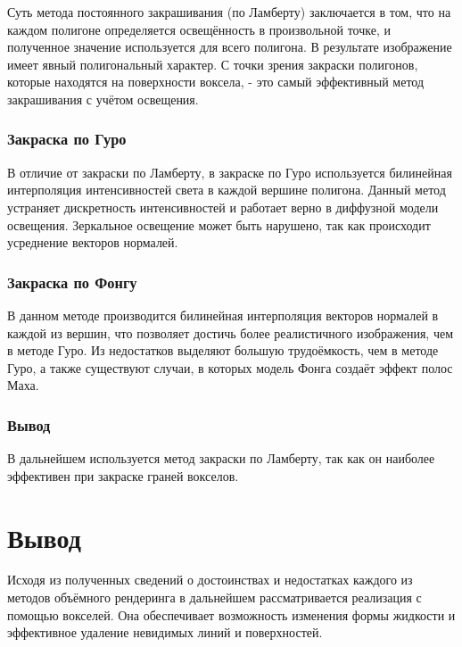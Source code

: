 Суть метода постоянного закрашивания (по Ламберту) заключается в том, что
на каждом полигоне определяется освещённость в произвольной точке, и полученное значение
используется для всего полигона\cite{site:fill}. В результате изображение имеет явный полигональный характер.
С точки зрения закраски полигонов, которые находятся на поверхности воксела, - это самый эффективный метод закрашивания с учётом освещения\cite{site:fill}.

\subsubsection{Закраска по Гуро}

В отличие от закраски по Ламберту, в закраске по Гуро используется билинейная интерполяция
интенсивностей света в каждой вершине полигона. Данный метод устраняет дискретность интенсивностей и работает верно в диффузной модели освещения. Зеркальное освещение может быть нарушено, так как происходит усреднение
векторов нормалей\cite{site:fill}.

\subsubsection{Закраска по Фонгу}

В данном методе производится билинейная интерполяция векторов нормалей в каждой из вершин, что
позволяет достичь более реалистичного изображения, чем в методе Гуро. Из недостатков выделяют
большую трудоёмкость, чем в методе Гуро, а также существуют случаи, в которых модель Фонга создаёт
эффект полос Маха\cite{site:fill}.

\subsubsection{Вывод}

В дальнейшем используется метод закраски по Ламберту, так как он наиболее эффективен при закраске граней вокселов.

\section{Вывод}

Исходя из полученных сведений о достоинствах и недостатках каждого из методов объёмного
рендеринга в дальнейшем рассматривается реализация с помощью вокселей. Она обеспечивает
возможность изменения формы жидкости и эффективное удаление невидимых линий и поверхностей.
